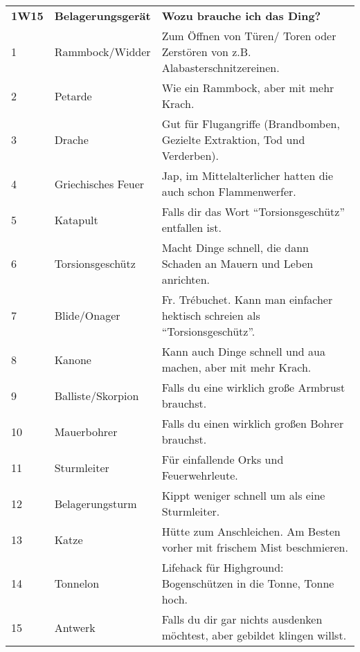 \documentclass[final]{multiversum}
\begin{document}
\begin{table*}[!t]
      \begin{framed}
      \begin{tabular}{p{}p{}p{}}
      \textbf{1W15} & \textbf{Belagerungsgerät} & \textbf{Wozu brauche ich das Ding?}\\
      1             & Rammbock/Widder           & Zum Öffnen von Türen/ Toren oder Zerstören von z.B. Alabasterschnitzereinen. \\
      2             & Petarde                   & Wie ein Rammbock, aber mit mehr Krach.\\
      3             & Drache                    & Gut für Flugangriffe (Brandbomben, Gezielte Extraktion, Tod und Verderben).\\
      4             & Griechisches Feuer        & Jap, im Mittelalterlicher hatten die auch schon Flammenwerfer.\\
      5             & Katapult                  & Falls dir das Wort \enquote{Torsionsgeschütz} entfallen ist.\\
      6             & Torsionsgeschütz          & Macht Dinge schnell, die dann Schaden an Mauern und Leben anrichten.\\
      7             & Blide/Onager              & Fr. Trébuchet. Kann man einfacher hektisch schreien als \enquote{Torsionsgeschütz}.\\
      8             & Kanone                    & Kann auch Dinge schnell und aua machen, aber mit mehr Krach.\\
      9             & Balliste/Skorpion         & Falls du eine wirklich große Armbrust brauchst.\\
      10            & Mauerbohrer               & Falls du einen wirklich großen Bohrer brauchst.\\
      11            & Sturmleiter               & Für einfallende Orks und Feuerwehrleute.\\
      12            & Belagerungsturm           & Kippt weniger schnell um als eine Sturmleiter.\\
      13            & Katze                     & Hütte zum Anschleichen. Am Besten vorher mit frischem Mist beschmieren.\\
      14            & Tonnelon                  & Lifehack für Highground: Bogenschützen in die Tonne, Tonne hoch.\\
      15            & Antwerk                   & Falls du dir gar nichts ausdenken möchtest, aber gebildet klingen willst.\\

      \end{tabular}
      \end{framed}
      \end{table*}
\end{document}
